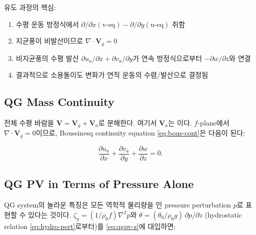 
\begin{hisublock}
유도 과정의 핵심:
\begin{enumerate}
  \item 수평 운동 방정식에서 $\partial/\partial x(\text{v-eq}) - \partial/\partial y(\text{u-eq})$ 취함
  \item 지균풍이 비발산이므로 $\nabla\cdot\mathbf{V}_g = 0$
  \item 비지균풍의 수평 발산 $\partial u_a/\partial x + \partial v_a/\partial y$가 연속 방정식으로부터
        $-\partial w/\partial z$와 연결
  \item 결과적으로 소용돌이도 변화가 연직 운동의 수렴/발산으로 결정됨
\end{enumerate}
\end{hisublock}

\subsection{QG Mass Continuity}\label{subsec:qg-cont}

전체 수평 바람을
$\mathbf{V} = \mathbf{V}_g + \mathbf{V}_a$로 분해한다. 여기서 $\mathbf{V}_a$는
이다.  $f$-plane에서 $\nabla\cdot\mathbf{V}_g = 0$이므로,
Boussinesq continuity equation \eqref{eq:bous-cont}은 다음이 된다:

\begin{equation}\label{eq:qg-cont}
  \frac{\partial u_a}{\partial x}
  + \frac{\partial v_a}{\partial y}
  + \frac{\partial w}{\partial z} = 0.
\end{equation}


\subsection{QG PV in Terms of Pressure Alone}\label{subsec:qgpv-pressure}

QG system의 놀라운 특징은 모든 역학적 물리량을
인 pressure perturbation $p$로 표현할 수 있다는 것이다.
$\zeta_g = (1/\rho_0 f)\nabla^2 p$와
$\theta = (\theta_0/\rho_0 g)\,\partial p/\partial z$ (hydrostatic
relation \eqref{eq:hydro-pert}로부터)를 \eqref{eq:qgpv-z}에 대입하면:

